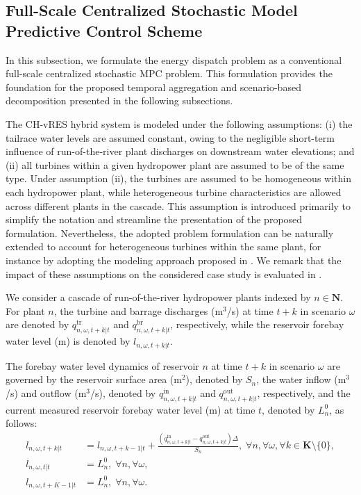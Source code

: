 \documentclass[a4paper,fleqn]{cas-sc}
\begin{document}
\subsection{Full-Scale Centralized Stochastic Model Predictive Control Scheme}
\label{subsec:SMPC}

In this subsection, we formulate the energy dispatch problem as a conventional full-scale centralized stochastic MPC problem.
This formulation provides the foundation for the proposed temporal aggregation and scenario-based decomposition presented in the following subsections.

The CH-vRES hybrid system is modeled under the following assumptions:
(i) the tailrace water levels are assumed constant, owing to the negligible short-term influence of run-of-the-river plant discharges on downstream water elevations; and
(ii) all turbines within a given hydropower plant are assumed to be of the same type.
Under assumption (ii), the turbines are assumed to be homogeneous within each hydropower plant, while heterogeneous turbine characteristics are allowed across different plants in the cascade. 
This assumption is introduced primarily to simplify the notation and streamline the presentation of the proposed formulation.
Nevertheless, the adopted problem formulation can be naturally extended to account for heterogeneous turbines within the same plant, for instance by adopting the modeling approach proposed in \cite{anagnostopoulos2007optimal}.
We remark that the impact of these assumptions on the considered case study is evaluated in \cite{11270217}.

We consider a cascade of run-of-the-river hydropower plants indexed by $n \in \boldsymbol{N}$.
For plant $n$, the turbine and barrage discharges (m$^3$/s) at time $t+k$ in scenario $\omega$ are denoted by $q^{\mathrm{tr}}_{n,\omega,t+k|t}$ and $q^{\mathrm{br}}_{n,\omega,t+k|t}$, respectively,
while the reservoir forebay water level (m) is denoted by $l_{n,\omega,t+k|t}$.

The forebay water level dynamics of reservoir $n$ at time $t+k$ in scenario $\omega$ are governed by the reservoir surface area (m$^2$), denoted by $S_n$,
the water inflow (m$^3$/s) and outflow (m$^3$/s), denoted by $q^{\mathrm{in}}_{n,\omega,t+k|t}$ and $q^{\mathrm{out}}_{n,\omega,t+k|t}$, respectively,
and the current measured reservoir forebay water level (m) at time $t$, denoted by $L^0_{n}$, as follows:
\begin{align}
l_{n, \omega, t+k | t} & = l_{n, \omega, t+k-1 | t} + \frac{\left(q^{\mathrm{in}}_{n, \omega, t+k | t} - q^{\mathrm{out}}_{n, \omega, t+k | t}\right) \Delta}{S_n}, \; \forall n, \forall \omega, \forall k \in \boldsymbol{K} \setminus \{0\}, \label{eq:cen_sto_water_level}\\
l_{n, \omega, t | t} & = L^0_{n}, \; \forall n, \forall \omega, \label{eq:cen_sto_water_level_init}\\
l_{n, \omega, t + K-1 | t} & = L^0_{n}, \; \forall n, \forall \omega. \label{eq:cen_sto_water_level_final}
\end{align}
\end{document}
